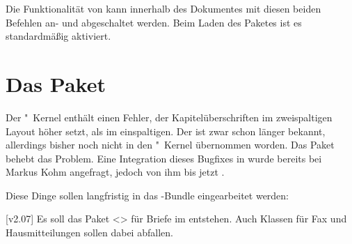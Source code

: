 \begin{Bundle*}{}
\begin{Declaration}[v2.02]{}
\begin{Declaration}[v2.02]{}
\printdeclarationlist%
%
%
Die Funktionalität von  kann innerhalb des Dokumentes mit 
diesen beiden Befehlen an- und abgeschaltet werden. Beim Laden des Paketes ist 
es standardmäßig aktiviert.
\end{Declaration}
\end{Declaration}
%
%
\end{Bundle*}



\section{Das Paket }
\begin{Bundle*}{}
%
%
Der "~Kernel enthält einen Fehler, der Kapitelüberschriften im
zweispaltigen Layout höher setzt, als im einspaltigen. Der 
ist zwar schon länger bekannt, allerdings bisher noch nicht in den 
"~Kernel übernommen worden. Das Paket  behebt 
das Problem. Eine Integration dieses Bugfixes in \KOMAScript{} wurde bereits 
bei Markus Kohm angefragt, jedoch von ihm bis jetzt 
.
\end{Bundle*}


Diese Dinge sollen langfristig in das \TUDScript-Bundle eingearbeitet werden:

[v2.07]
Es soll das Paket <> für Briefe im \TUDCD entstehen. 
Auch Klassen für Fax und Hausmitteilungen sollen dabei abfallen.

